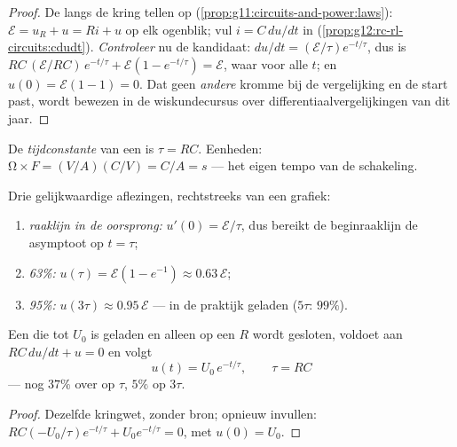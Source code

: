 \begin{proof}
De  langs de kring tellen op
(\cref{prop:g11:circuits-and-power:laws}): $\mathcal{E} = u_R + u = Ri + u$ op
elk ogenblik; vul $i = C\,du/dt$ in
(\cref{prop:g12:rc-rl-circuits:cdudt}). \emph{Controleer} nu de kandidaat:
$du/dt = (\mathcal{E}/\tau)e^{-t/\tau}$, dus is
$RC\,(\mathcal{E}/RC)\,e^{-t/\tau} + \mathcal{E}(1 - e^{-t/\tau}) =
\mathcal{E}$, waar voor alle $t$; en $u(0) = \mathcal{E}(1-1) = 0$. Dat geen
\emph{andere} kromme bij de vergelijking en de start past, wordt bewezen in
de wiskundecursus over differentiaalvergelijkingen van dit jaar.
\end{proof}

\begin{definition}[Tijdconstante]\label{def:g12:rc-rl-circuits:tau}
De \emph{tijdconstante} van een  is
$\tau = RC$. Eenheden: $\unit{\ohm} \times \unit{F} =
(\unit{V/A})(\unit{C/V}) = \unit{C/A} = \unit{s}$ --- het eigen tempo van de
schakeling.
\end{definition}

\begin{method}\label{met:g12:rc-rl-circuits:reading}
Drie gelijkwaardige aflezingen, rechtstreeks van een grafiek:
\begin{enumerate}
  \item \emph{raaklijn in de oorsprong:} $u'(0) = \mathcal{E}/\tau$, dus
        bereikt de beginraaklijn de asymptoot op $t = \tau$;
  \item \emph{63\%:} $u(\tau) = \mathcal{E}(1 - e^{-1}) \approx
        0.63\,\mathcal{E}$;
  \item \emph{95\%:} $u(3\tau) \approx 0.95\,\mathcal{E}$ --- in de praktijk
        geladen ($5\tau$: $99\%$).
\end{enumerate}
\end{method}

\begin{proposition}[Ontlading]\label{prop:g12:rc-rl-circuits:discharge}
Een  die tot $U_0$ is geladen en alleen op een  $R$ wordt
gesloten, voldoet aan $RC\,du/dt + u = 0$ en volgt
\[
u(t) = U_0\,e^{-t/\tau}, \qquad \tau = RC
\]
--- nog $37\%$ over op $\tau$, $5\%$ op $3\tau$.
\end{proposition}

\begin{proof}
Dezelfde kringwet, zonder bron; opnieuw invullen:
$RC(-U_0/\tau)e^{-t/\tau} + U_0 e^{-t/\tau} = 0$, met $u(0) = U_0$.
\end{proof}

